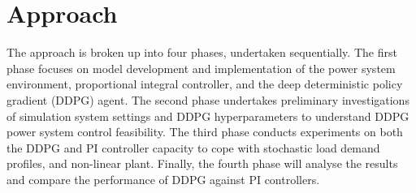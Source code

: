 \chapter{Approach}
The approach is broken up into four phases, undertaken sequentially. The first phase focuses on model development and implementation of the power system environment, proportional integral controller, and the deep deterministic policy gradient (DDPG) agent. The second phase undertakes preliminary investigations of simulation system settings and DDPG hyperparameters to understand DDPG power system control feasibility. The third phase conducts experiments on both the DDPG and PI controller capacity to cope with stochastic load demand profiles, and non-linear plant. Finally, the fourth phase will analyse the results and compare the performance of DDPG against PI controllers.













